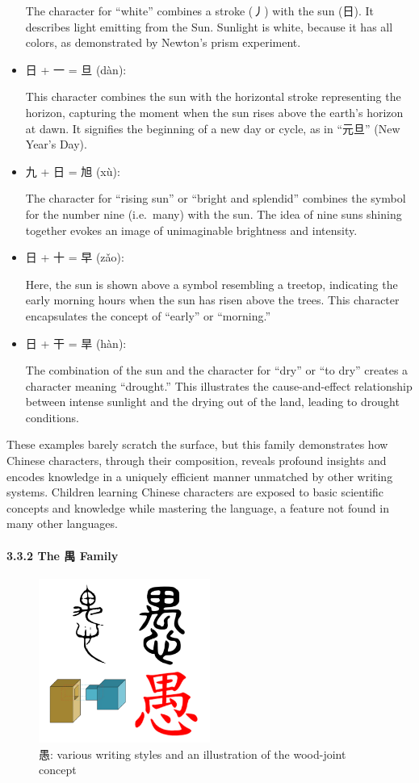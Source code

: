 \documentclass[
  11pt,
  letterpaper,
]{article}
\begin{document}
\begin{itemize}
  The character for ``white'' combines a stroke (丿) with the sun (日).
  It describes light emitting from the Sun. Sunlight is white, because
  it has all colors, as demonstrated by Newton's prism experiment.
\item
  日 + 一 = 旦 (dàn):

  This character combines the sun with the horizontal stroke
  representing the horizon, capturing the moment when the sun rises
  above the earth's horizon at dawn. It signifies the beginning of a new
  day or cycle, as in ``元旦'' (New Year's Day).
\item
  九 + 日 = 旭 (xù):

  The character for ``rising sun'' or ``bright and splendid'' combines
  the symbol for the number nine (i.e.~many) with the sun. The idea of
  nine suns shining together evokes an image of unimaginable brightness
  and intensity.
\item
  日 + 十 = 早 (zǎo):

  Here, the sun is shown above a symbol resembling a treetop, indicating
  the early morning hours when the sun has risen above the trees. This
  character encapsulates the concept of ``early'' or ``morning.''
\item
  日 + 干 = 旱 (hàn):

  The combination of the sun and the character for ``dry'' or ``to dry''
  creates a character meaning ``drought.'' This illustrates the
  cause-and-effect relationship between intense sunlight and the drying
  out of the land, leading to drought conditions.
\end{itemize}

These examples barely scratch the surface, but this family demonstrates
how Chinese characters, through their composition, reveals profound
insights and encodes knowledge in a uniquely efficient manner unmatched
by other writing systems. Children learning Chinese characters are
exposed to basic scientific concepts and knowledge while mastering the
language, a feature not found in many other languages.

\paragraph{3.3.2 The 禺 Family}\label{the-ux79ba-family}

\begin{figure}
\centering
\includegraphics[width=0.5\textwidth]{./images/zi_join.png}
\caption{愚: various writing styles and an illustration of the wood-joint concept}
\end{figure}
\end{document}
